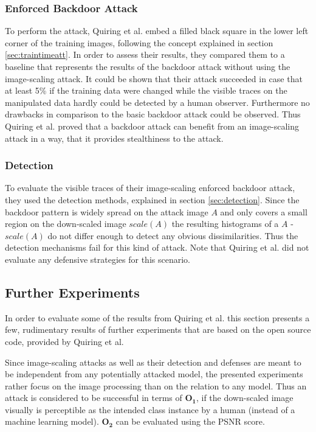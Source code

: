 \documentclass[sigconf]{acmart}
\begin{document}
\subsubsection{Enforced Backdoor Attack}
To perform the attack, Quiring et al. embed a filled black square in the lower left corner of the training images, following the concept explained in section \ref{sec:traintimeatt}.
In order to assess their results, they compared them to a baseline that represents the results of the backdoor attack without using the image-scaling attack.
It could be shown that their attack succeeded in case that at least 5\% if the training data were changed while the visible traces on the manipulated data hardly could be detected by a human observer.
Furthermore no drawbacks in comparison to the basic backdoor attack could be observed.
Thus Quiring et al. proved that a backdoor attack can benefit from an image-scaling attack in a way, that it provides stealthiness to the attack.

\subsubsection{Detection}
To evaluate the visible traces of their image-scaling enforced backdoor attack, they used the detection methods, explained in section \ref{sec:detection}.
Since the backdoor pattern is widely spread on the attack image $A$ and only covers a small region on the down-scaled image $scale(A)$ the resulting histograms of a $A$ - $scale(A)$ do not differ enough to detect any obvious dissimilarities.
Thus the detection mechanisms fail for this kind of attack.
Note that Quiring et al. did not evaluate any defensive strategies for this scenario. 

\subsection{Further Experiments}
In order to evaluate some of the results from Quiring et al. this section presents a few, rudimentary results of further experiments that are based on the open source code, provided by Quiring et al.

Since image-scaling attacks as well as their detection and defenses are meant to be independent from any potentially attacked model, the presented experiments rather focus on the image processing than on the relation to any model.
Thus an attack is considered to be successful in terms of $\boldsymbol{O_1}$, if the down-scaled image visually is perceptible as the intended class instance by a human (instead of a machine learning model).
$\boldsymbol{O_2}$ can be evaluated using the PSNR score.
\end{document}
